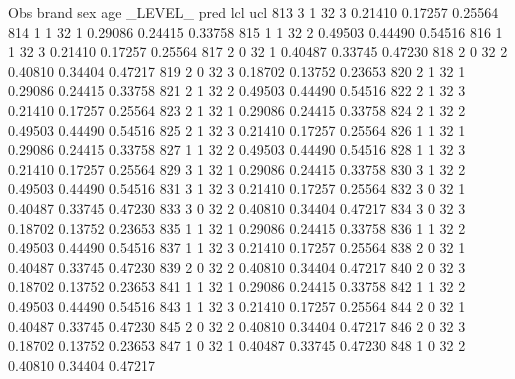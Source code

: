 \documentclass{article}
\begin{document}
\begin{Woutput}
 Obs    brand    sex    age    _LEVEL_      pred       lcl        ucl
 813      3       1      32       3       0.21410    0.17257    0.25564
 814      1       1      32       1       0.29086    0.24415    0.33758
 815      1       1      32       2       0.49503    0.44490    0.54516
 816      1       1      32       3       0.21410    0.17257    0.25564
 817      2       0      32       1       0.40487    0.33745    0.47230
 818      2       0      32       2       0.40810    0.34404    0.47217
 819      2       0      32       3       0.18702    0.13752    0.23653
 820      2       1      32       1       0.29086    0.24415    0.33758
 821      2       1      32       2       0.49503    0.44490    0.54516
 822      2       1      32       3       0.21410    0.17257    0.25564
 823      2       1      32       1       0.29086    0.24415    0.33758
 824      2       1      32       2       0.49503    0.44490    0.54516
 825      2       1      32       3       0.21410    0.17257    0.25564
 826      1       1      32       1       0.29086    0.24415    0.33758
 827      1       1      32       2       0.49503    0.44490    0.54516
 828      1       1      32       3       0.21410    0.17257    0.25564
 829      3       1      32       1       0.29086    0.24415    0.33758
 830      3       1      32       2       0.49503    0.44490    0.54516
 831      3       1      32       3       0.21410    0.17257    0.25564
 832      3       0      32       1       0.40487    0.33745    0.47230
 833      3       0      32       2       0.40810    0.34404    0.47217
 834      3       0      32       3       0.18702    0.13752    0.23653
 835      1       1      32       1       0.29086    0.24415    0.33758
 836      1       1      32       2       0.49503    0.44490    0.54516
 837      1       1      32       3       0.21410    0.17257    0.25564
 838      2       0      32       1       0.40487    0.33745    0.47230
 839      2       0      32       2       0.40810    0.34404    0.47217
 840      2       0      32       3       0.18702    0.13752    0.23653
 841      1       1      32       1       0.29086    0.24415    0.33758
 842      1       1      32       2       0.49503    0.44490    0.54516
 843      1       1      32       3       0.21410    0.17257    0.25564
 844      2       0      32       1       0.40487    0.33745    0.47230
 845      2       0      32       2       0.40810    0.34404    0.47217
 846      2       0      32       3       0.18702    0.13752    0.23653
 847      1       0      32       1       0.40487    0.33745    0.47230
 848      1       0      32       2       0.40810    0.34404    0.47217

\end{Woutput}
\end{document}
